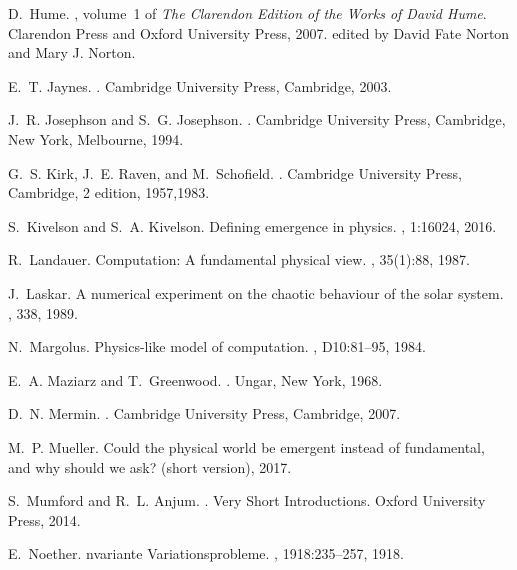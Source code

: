 \documentclass[12pt]{article}
\begin{document}
\begin{thebibliography}{10}
D.~Hume.
, volume~1 of
  {\em The Clarendon Edition of the Works of David Hume}.
\newblock Clarendon Press and Oxford University Press, 2007.
\newblock edited by David Fate Norton and Mary J. Norton.

E.~T. Jaynes.
.
\newblock Cambridge University Press, Cambridge, 2003.

J.~R. Josephson and S.~G. Josephson.
.
\newblock Cambridge University Press, Cambridge, New York, Melbourne, 1994.

G.~S. Kirk, J.~E. Raven, and M.~Schofield.
.
\newblock Cambridge University Press, Cambridge, 2 edition, 1957,1983.

S.~Kivelson and S.~A. Kivelson.
\newblock Defining emergence in physics.
, 1:16024, 2016.

R.~Landauer.
\newblock Computation: A fundamental physical view.
, 35(1):88, 1987.

J.~Laskar.
\newblock A numerical experiment on the chaotic behaviour of the solar system.
, 338, 1989.

N.~Margolus.
\newblock Physics-like model of computation.
, D10:81--95, 1984.

E.~A. Maziarz and T.~Greenwood.
.
\newblock Ungar, New York, 1968.

D.~N. Mermin.
.
\newblock Cambridge University Press, Cambridge, 2007.

M.~P. Mueller.
\newblock Could the physical world be emergent instead of fundamental, and why
  should we ask? (short version), 2017.

S.~Mumford and R.~L. Anjum.
.
\newblock Very Short Introductions. Oxford University Press, 2014.

E.~Noether.
nvariante {V}ariationsprobleme.
, 1918:235--257, 1918.


\end{thebibliography}
\end{document}
